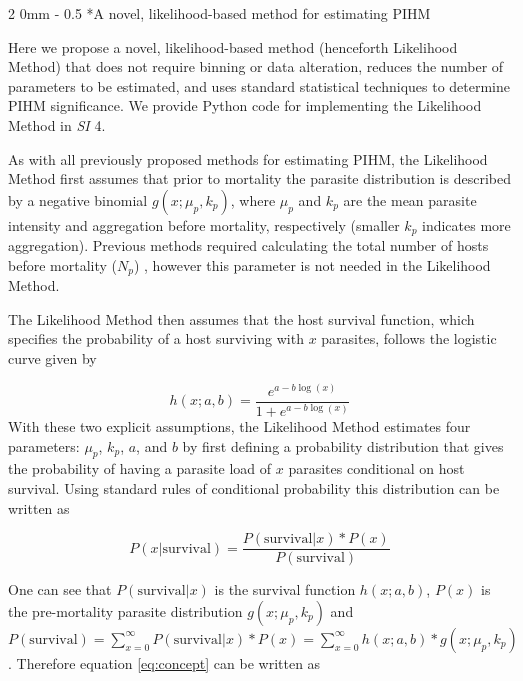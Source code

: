 \documentclass[12pt, a4paper]{article}
\makeatletter
\renewcommand{\subsection}{\@startsection
{subsection}%
{2}%
{0mm}%
{-\baselineskip}%
{0.5\baselineskip}%
{\normalfont\bf}} %
\makeatother
\begin{document}
\subsection*{A novel, likelihood-based method for estimating PIHM}

Here we propose a novel, likelihood-based method (henceforth Likelihood Method) that does not
require binning or data alteration, reduces the number of
parameters to be estimated, and  uses standard statistical techniques to determine PIHM significance. We provide Python code for implementing the Likelihood Method in \emph{SI} 4.

As with all previously proposed methods for estimating PIHM, the
Likelihood Method first assumes that prior to mortality the parasite distribution is described by a negative binomial $g(x; \mu_p, k_p)$, where $\mu_p$ and $k_p$ are the mean parasite intensity and aggregation before mortality, respectively (smaller $k_p$ indicates more aggregation).   Previous methods required calculating the total number of hosts before mortality ($N_p$) \citep{Crofton1971a,Adjei1986}, however this parameter is not needed in the Likelihood Method.

The Likelihood Method then assumes that the host survival function, which specifies the probability of a host surviving with $x$ parasites, follows the logistic curve given by

\begin{equation}
    h(x ; a, b) = \dfrac{e^{a - b \log(x)}}{1 + e^{a - b \log(x)}}
    \label{eq:logistic}
\end{equation}
With these two explicit assumptions, the Likelihood Method estimates four parameters: $\mu_p$, $k_p$, $a$, and $b$ by  first defining a probability distribution that gives the probability of having a parasite load of $x$ parasites conditional on host survival.  Using standard rules of conditional probability this distribution can be written as

\begin{equation}
    P(x | \text{survival}) = \dfrac{P(\text{survival} | x) * P(x)}{P(\text{survival})}
    \label{eq:concept}
\end{equation}

One can see that $P(\text{survival} | x)$ is the survival function $h(x; a, b)$, $P(x)$ is the pre-mortality parasite distribution $g(x; \mu_p, k_p)$ and $P(\text{survival}) = \sum_{x=0}^{\infty} P(\text{survival} | x) * P(x) =  \sum_{x=0}^{\infty} h(x; a, b)  * g(x; \mu_p, k_p)$. Therefore equation \ref{eq:concept} can be written as
\end{document}
